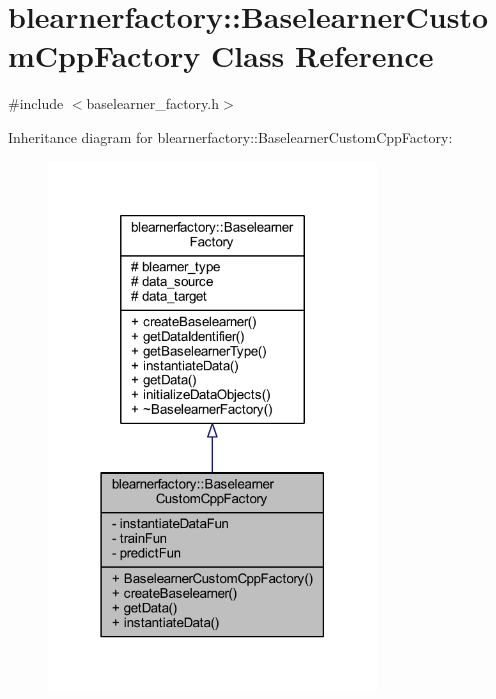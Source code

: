 \hypertarget{classblearnerfactory_1_1_baselearner_custom_cpp_factory}{}\section{blearnerfactory\+:\+:Baselearner\+Custom\+Cpp\+Factory Class Reference}
\label{classblearnerfactory_1_1_baselearner_custom_cpp_factory}


{\ttfamily \#include $<$baselearner\+\_\+factory.\+h$>$}



Inheritance diagram for blearnerfactory\+:\+:Baselearner\+Custom\+Cpp\+Factory\+:\nopagebreak
\begin{figure}[H]
\begin{center}
\leavevmode
\includegraphics[width=247pt]{classblearnerfactory_1_1_baselearner_custom_cpp_factory__inherit__graph}
\end{center}
\end{figure}


